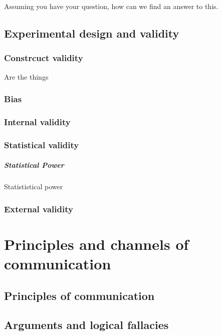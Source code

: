 \documentclass{tufte-book}
\begin{document}
Assuming you have your question, how can we find an answer to this.



\section{Experimental design and validity}

\subsection{Constrcuct validity}

Are the things 

\subsection{Bias}


\citep{Ransohoff-Biasasthreat-2005}

\subsection{Internal validity}


\subsection{Statistical validity}


\paragraph{Statistical Power} Statististical power


\subsection{External validity}




\chapter{Principles and channels of communication}


\section{Principles of communication}



\section{Arguments and logical fallacies}
\end{document}
